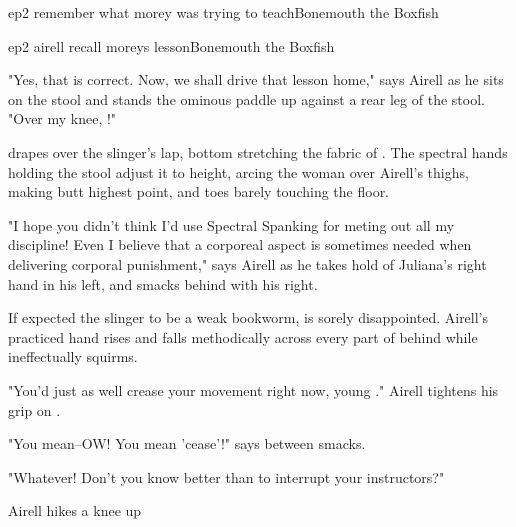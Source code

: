 \documentclass{book}
\begin{document}
\begin{childnode}{ep2 remember what morey was trying to teach}{Bonemouth the Boxfish}



\end{childnode}

\begin{childnode}{ep2 airell recall moreys lesson}{Bonemouth the Boxfish}

"Yes, that is correct. Now, we shall drive that lesson home," says Airell as he sits on the stool and stands the ominous paddle up against a rear leg of the stool. "Over my knee, \boygirl{}!"

\name{} drapes \himselfherself{} over the slinger's lap, \hisher{} bottom stretching the fabric of \hisher{} \trousers{}. The spectral hands holding the stool adjust it to \names{} height, arcing 
the woman over Airell's thighs, making \hisher{} butt \hisher{} highest point, and \hisher{} toes barely touching the floor. 

"I hope you didn't think I'd use Spectral Spanking for meting out all my discipline! Even I believe that a corporeal aspect is sometimes needed when delivering corporal punishment," says Airell 
as he takes hold of Juliana's right hand in his left, and smacks \hisher{} behind with his right. 

If \name{} expected the slinger to be a weak bookworm, \heshe{} is sorely disappointed. Airell's practiced hand rises and falls methodically across every part of \hisher{} \quivering{} behind while 
\heshe{} ineffectually squirms. 

"You'd just as well crease your movement right now, young \manlady{}." Airell tightens his grip on \name{}.

"You mean--OW! You mean 'cease'!" says \name{} between smacks. 

"Whatever! Don't you know better than to interrupt your instructors?" 

Airell hikes a knee up 


\end{childnode}
\end{document}
